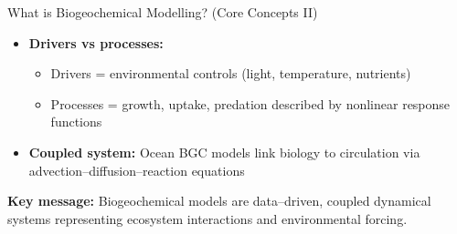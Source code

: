 \documentclass[english,aspectratio=169]{beamer}
\begin{document}
\begin{frame}{What is Biogeochemical Modelling? (Core Concepts II)}
\begin{itemize}
    \item \textbf{Drivers vs processes:}
    \begin{itemize}
        \item Drivers = environmental controls (light, temperature, nutrients)
        \item Processes = growth, uptake, predation described by nonlinear response functions
    \end{itemize}
    \item \textbf{Coupled system:} Ocean BGC models link biology to circulation via advection--diffusion--reaction equations
\end{itemize}
\textbf{Key message:} Biogeochemical models are data--driven, coupled dynamical systems representing ecosystem interactions and environmental forcing.
\end{frame}
\end{document}
